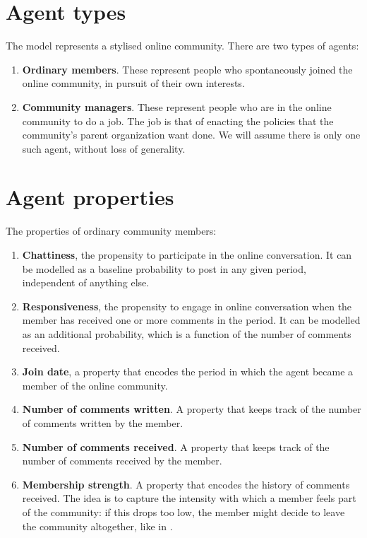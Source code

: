 \documentclass{article}
\begin{document}
\section{Agent types}
 
The model represents a stylised online community. There are two types of agents:

\begin{enumerate}
\item \textbf{Ordinary members}. These represent people who spontaneously joined the online community, in pursuit of their own interests.
\item \textbf{Community managers}. These represent people who are in the online community to do a job. The job is that of enacting the policies that the community's parent organization want done. We will assume there is only one such agent, without loss of generality.
\end{enumerate}

\section{Agent properties}

The properties of ordinary community members:

\begin{enumerate}
\item \textbf{Chattiness}, the propensity to participate in the online conversation. It can be modelled as a baseline probability to post in any given period, independent of anything else. 
\item \textbf{Responsiveness}, the propensity to engage in online conversation when the member has received one or more comments in the period. It can be modelled as an additional probability, which is a function of the number of comments received. 
\item \textbf{Join date}, a property that encodes the period in which the agent became a member of the online community. 
\item \textbf{Number of comments written}. A property that keeps track of the number of comments written by the member. 
\item \textbf{Number of comments received}. A property that keeps track of the number of comments received by the member.
\item \textbf{Membership strength}. A property that encodes the history of comments received. The idea is to capture the intensity with which a member feels part of the community: if this drops too low, the member might decide to leave the community altogether, like in \cite{kim2015group}.  
\end{enumerate} 
\end{document}
